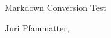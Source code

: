 \documentclass[a3paper,8pt]{extarticle}
\begin{document}
\begin{multicols*}{4}

    \begin{center}
        \huge{Markdown Conversion Test \par}
        \normalsize{Juri Pfammatter,}
    \end{center}
    \vspace*{8pt}
    



\end{multicols*}
\end{document}
